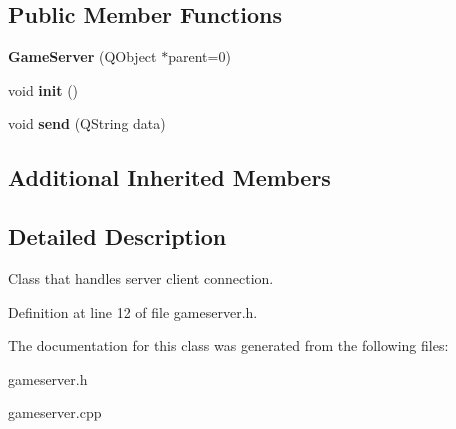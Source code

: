 \subsection*{Public Member Functions}
\begin{DoxyCompactItemize}
\item 
\hypertarget{class_game_server_a23246629b4e19dcd029ad89455147461}{{\bfseries Game\-Server} (Q\-Object $\ast$parent=0)}\label{class_game_server_a23246629b4e19dcd029ad89455147461}

\item 
\hypertarget{class_game_server_a65f06eb193e2ce2670f1b2f65c0a7469}{void {\bfseries init} ()}\label{class_game_server_a65f06eb193e2ce2670f1b2f65c0a7469}

\item 
\hypertarget{class_game_server_a58e009e4c2444745fb86a4085a0ab376}{void {\bfseries send} (Q\-String data)}\label{class_game_server_a58e009e4c2444745fb86a4085a0ab376}

\end{DoxyCompactItemize}
\subsection*{Additional Inherited Members}


\subsection{Detailed Description}
Class that handles server client connection. 

Definition at line 12 of file gameserver.\-h.



The documentation for this class was generated from the following files\-:\begin{DoxyCompactItemize}
\item 
gameserver.\-h\item 
gameserver.\-cpp\end{DoxyCompactItemize}
